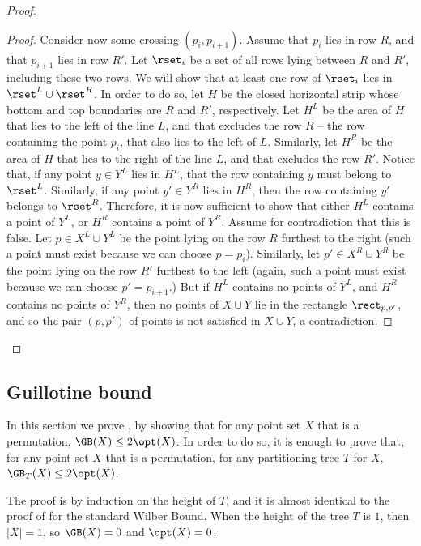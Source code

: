 \documentclass{toc}
\begin{document}
\begin{proof}{}
\begin{proof}{}
Consider now some crossing $(p_i,p_{i+1})$. Assume that $p_i$ lies in row $R$, and that $p_{i+1}$ lies in row $R'$. Let $\rset_i$ be a set of all rows lying between $R$ and $R'$, including these two rows. We will show that at least one row of $\rset_i$ lies in $\rset^L\cup \rset^R$. In order to do so, let $H$ be the closed horizontal strip whose bottom and top boundaries are $R$ and $R'$, respectively. Let $H^L$ be the area of $H$ that lies to the left of the line $L$, and that excludes the row $R$ -- the row containing the point $p_i$, that also lies to the left of $L$. Similarly, let $H^R$ be the area of $H$ that lies to the right of the line $L$, and that excludes the row $R'$. Notice that, if any point $y\in Y^L$ lies in $H^L$, that the row containing $y$  must belong to $\rset^L$. Similarly, if any point $y'\in Y^R$ lies in $H^R$, then the row containing $y'$ belongs to $\rset^R$. Therefore, it is now sufficient to show that either $H^L$ contains a point of $Y^L$, or $H^R$ contains a point of $Y^R$. Assume for contradiction that this is false. Let $p\in X^L\cup Y^L$ be the point lying on the row $R$ furthest to the right (such a point must exist because we can choose $p=p_i$). Similarly, let $p'\in X^R\cup Y^R$ be the point lying on the row $R'$ furthest to the left (again, such a point must exist because we can choose $p'=p_{i+1}$.) But if $H^L$ contains no points of $Y^L$, and $H^R$ contains no points of $Y^R$, then no points of $X\cup Y$ lie in the rectangle $\rect_{p,p'}$, and so the pair $(p,p')$ of points is not satisfied in $X\cup Y$, a contradiction.
\end{proof}	
\end{proof}

\subsection{Guillotine bound}
\label{sec: GB proof} 

In this section we prove , by showing that for any point set $X$ that is a permutation, $\GB(X)\leq 2\opt(X)$. In order to do so, it is enough to prove that, for any point set $X$ that is a permutation, for any partitioning tree $T$ for $X$, $\GB_T(X) \leq 2\opt(X)$. 

The proof is by induction on the height of $T$, and it is almost identical to the proof of  for the standard Wilber Bound. When the height of the tree $T$ is $1$, then $|X|=1$, so $\GB(X)=0$ and $\opt(X)=0$.
\end{document}
